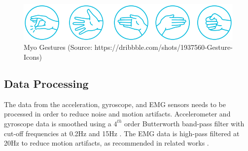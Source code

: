 \begin{figure}
	\centering
	\includegraphics[width=0.7\linewidth]{pictures/myogestures}
	\caption{Myo Gestures (Source: https://dribbble.com/shots/1937560-Gesture-Icons)}
	\label{fig:myogestures}
\end{figure}

\subsection{Data Processing}
\label{sec:Approach:Data-Processing}
The data from the acceleration, gyroscope, and EMG sensors needs to be processed in order to reduce noise and motion artifacts. Accelerometer and gyroscope data is smoothed using a $4^{th}$ order Butterworth band-pass filter with cut-off frequencies at 0.2Hz and 15Hz \cite{1419604}. The EMG data is high-pass filtered at 20Hz to reduce motion artifacts, as recommended in related works \cite{DeLuca2010}.

